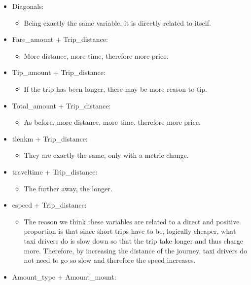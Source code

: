 \documentclass[
  18pt,
  a4paper]{article}
\providecommand{\tightlist}{%
  \setlength{\itemsep}{0pt}\setlength{\parskip}{0pt}}
\begin{document}
\begin{itemize}
\tightlist
\item
  Diagonals:

  \begin{itemize}
  \tightlist
  \item
    Being exactly the same variable, it is directly related to itself.
  \end{itemize}
\item
  Fare\_amount + Trip\_distance:

  \begin{itemize}
  \tightlist
  \item
    More distance, more time, therefore more price.
  \end{itemize}
\item
  Tip\_amount + Trip\_distance:

  \begin{itemize}
  \tightlist
  \item
    If the trip has been longer, there may be more reason to tip.
  \end{itemize}
\item
  Total\_amount + Trip\_distance:

  \begin{itemize}
  \tightlist
  \item
    As before, more distance, more time, therefore more price.
  \end{itemize}
\item
  tlenkm + Trip\_distance:

  \begin{itemize}
  \tightlist
  \item
    They are exactly the same, only with a metric change.
  \end{itemize}
\item
  traveltime + Trip\_distance:

  \begin{itemize}
  \tightlist
  \item
    The further away, the longer.
  \end{itemize}
\item
  espeed + Trip\_distance:

  \begin{itemize}
  \tightlist
  \item
    The reason we think these variables are related to a direct and
    positive proportion is that since short trips have to be, logically
    cheaper, what taxi drivers do is slow down so that the trip take
    longer and thus charge more. Therefore, by increasing the distance
    of the journey, taxi drivers do not need to go so slow and therefore
    the speed increases.
  \end{itemize}
\item
  Amount\_type + Amount\_mount:


\end{itemize}
\end{document}

